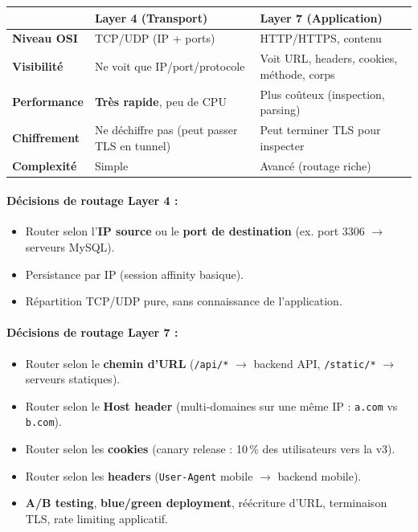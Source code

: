 \documentclass[12pt,a4paper]{article}
\begin{document}
\noindent
\begin{tabularx}{\textwidth}{@{}>{\raggedright\arraybackslash}p{2.4cm} Y Y@{}}
\toprule
 & \textbf{Layer 4 (Transport)} & \textbf{Layer 7 (Application)} \\
\midrule
\textbf{Niveau OSI} & TCP/UDP (IP + ports) & HTTP/HTTPS, contenu \\
\textbf{Visibilit\'e} & Ne voit que IP/port/protocole & Voit URL, headers, cookies, m\'ethode, corps \\
\textbf{Performance} & \textbf{Tr\`es rapide}, peu de CPU & Plus co\^uteux (inspection, parsing) \\
\textbf{Chiffrement} & Ne d\'echiffre pas (peut passer TLS en tunnel) & Peut terminer TLS pour inspecter \\
\textbf{Complexit\'e} & Simple & Avanc\'e (routage riche) \\
\bottomrule
\end{tabularx}

\paragraph{D\'ecisions de routage Layer 4 :}
\begin{itemize}
  \item Router selon l'\textbf{IP source} ou le \textbf{port de destination} (ex. port 3306 $\rightarrow$ serveurs MySQL).
  \item Persistance par IP (session affinity basique).
  \item R\'epartition TCP/UDP pure, sans connaissance de l'application.
\end{itemize}

\paragraph{D\'ecisions de routage Layer 7 :}
\begin{itemize}
  \item Router selon le \textbf{chemin d'URL} (\texttt{/api/*} $\rightarrow$ backend API, \texttt{/static/*} $\rightarrow$ serveurs statiques).
  \item Router selon le \textbf{Host header} (multi-domaines sur une m\^eme IP : \texttt{a.com} vs \texttt{b.com}).
  \item Router selon les \textbf{cookies} (canary release : 10\,\% des utilisateurs vers la v3).
  \item Router selon les \textbf{headers} (\texttt{User-Agent} mobile $\rightarrow$ backend mobile).
  \item \textbf{A/B testing}, \textbf{blue/green deployment}, r\'e\'ecriture d'URL, terminaison TLS, rate limiting applicatif.
\end{itemize}
\end{document}
